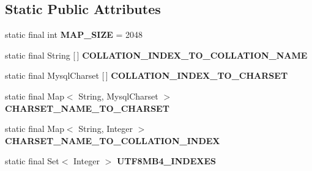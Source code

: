 \subsection*{Static Public Attributes}
\begin{DoxyCompactItemize}
\item 
\mbox{\label{classcom_1_1mysql_1_1cj_1_1_charset_mapping_a9425e1f5843d162962dea3b0230181c1}} 
static final int {\bfseries M\+A\+P\+\_\+\+S\+I\+ZE} = 2048
\item 
\mbox{\label{classcom_1_1mysql_1_1cj_1_1_charset_mapping_aaef0faa62527de38522133ab2bd7dc7f}} 
static final String \mbox{[}$\,$\mbox{]} {\bfseries C\+O\+L\+L\+A\+T\+I\+O\+N\+\_\+\+I\+N\+D\+E\+X\+\_\+\+T\+O\+\_\+\+C\+O\+L\+L\+A\+T\+I\+O\+N\+\_\+\+N\+A\+ME}
\item 
\mbox{\label{classcom_1_1mysql_1_1cj_1_1_charset_mapping_a26d7028102246354923910a17e2e1ee4}} 
static final Mysql\+Charset \mbox{[}$\,$\mbox{]} {\bfseries C\+O\+L\+L\+A\+T\+I\+O\+N\+\_\+\+I\+N\+D\+E\+X\+\_\+\+T\+O\+\_\+\+C\+H\+A\+R\+S\+ET}
\item 
\mbox{\label{classcom_1_1mysql_1_1cj_1_1_charset_mapping_a4e8f3b6a18adf7f56d95cd1678793808}} 
static final Map$<$ String, Mysql\+Charset $>$ {\bfseries C\+H\+A\+R\+S\+E\+T\+\_\+\+N\+A\+M\+E\+\_\+\+T\+O\+\_\+\+C\+H\+A\+R\+S\+ET}
\item 
\mbox{\label{classcom_1_1mysql_1_1cj_1_1_charset_mapping_adc45544deed277897844cfad6a367a4c}} 
static final Map$<$ String, Integer $>$ {\bfseries C\+H\+A\+R\+S\+E\+T\+\_\+\+N\+A\+M\+E\+\_\+\+T\+O\+\_\+\+C\+O\+L\+L\+A\+T\+I\+O\+N\+\_\+\+I\+N\+D\+EX}
\item 
\mbox{\label{classcom_1_1mysql_1_1cj_1_1_charset_mapping_a4d6abca534483a116a4255827b3f43e5}} 
static final Set$<$ Integer $>$ {\bfseries U\+T\+F8\+M\+B4\+\_\+\+I\+N\+D\+E\+X\+ES}
\item 
\mbox{\label{classcom_1_1mysql_1_1cj_1_1_charset_mapping_ab5a568e79b06bf2c7598e8ec2cbb5ca6}} 

\end{DoxyCompactItemize}
